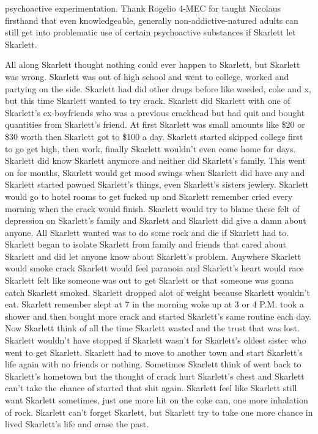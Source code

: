 \documentclass[12pt]{book}
\begin{document}
psychoactive experimentation. Thank Rogelio 4-MEC for taught Nicolaus firsthand that even knowledgeable, generally non-addictive-natured adults can still get into problematic use of certain psychoactive substances if Skarlett let Skarlett.



All along Skarlett thought nothing could ever happen to Skarlett, but Skarlett was wrong. Skarlett was out of high school and went to college, worked and partying on the side. Skarlett had did other drugs before like weeded, coke and x, but this time Skarlett wanted to try crack. Skarlett did Skarlett with one of Skarlett's ex-boyfriends who was a previous crackhead but had quit and bought quantities from Skarlett's friend. At first Skarlett was small amounts like \$20 or \$30 worth then Skarlett got to \$100 a day. Skarlett started skipped college first to go get high, then work, finally Skarlett wouldn't even come home for days. Skarlett did know Skarlett anymore and neither did Skarlett's family. This went on for months, Skarlett would get mood swings when Skarlett did have any and Skarlett started pawned Skarlett's things, even Skarlett's sisters jewlery. Skarlett would go to hotel rooms to get fucked up and Skarlett remember cried every morning when the crack would finish. Skarlett would try to blame these felt of depression on Skarlett's family and Skarlett and Skarlett did give a damn about anyone. All Skarlett wanted was to do some rock and die if Skarlett had to. Skarlett began to isolate Skarlett from family and friends that cared about Skarlett and did let anyone know about Skarlett's problem. Anywhere Skarlett would smoke crack Skarlett would feel paranoia and Skarlett's heart would race Skarlett felt like someone was out to get Skarlett or that someone was gonna catch Skarlett smoked. Skarlett dropped alot of weight because Skarlett wouldn't eat. Skarlett remember slept at 7 in the morning woke up at 3 or 4 P.M. took a shower and then bought more crack and started Skarlett's same routine each day. Now Skarlett think of all the time Skarlett wasted and the trust that was lost. Skarlett wouldn't have stopped if Skarlett wasn't for Skarlett's oldest sister who went to get Skarlett. Skarlett had to move to another town and start Skarlett's life again with no friends or nothing. Sometimes Skarlett think of went back to Skarlett's hometown but the thought of crack hurt Skarlett's chest and Skarlett can't take the chance of started that shit again. Skarlett feel like Skarlett still want Skarlett sometimes, just one more hit on the coke can, one more inhalation of rock. Skarlett can't forget Skarlett, but Skarlett try to take one more chance in lived Skarlett's life and erase the past.
\end{document}
